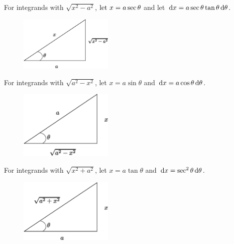 For integrands with $ \sqrt{x^{2}-a^{2}}$, $\text{let } x=a\sec \theta$ and let $\,\mathrm{d} x = a \sec \theta \tan \theta \,\mathrm{d} \theta $.
\begin{figure}[H]
  \begin{center}
    \includegraphics[width=0.4\textwidth]{continuous/integration/asectheta.eps}
  \end{center}
\end{figure}
For integrands with $\sqrt{a^2-x^2}$, let $x=a \sin \theta$ and $\,\mathrm{d} x = a \cos \theta \,\mathrm{d} \theta$.
\begin{figure}[H]
  \begin{center}
    \includegraphics[width=0.4\textwidth]{continuous/integration/asintheta.eps}
  \end{center}
\end{figure}
For integrands with $ \sqrt{x^2+a^2}$, let $x = a \tan \theta$ and $\,\mathrm{d} x = \sec^2 \theta \,\mathrm{d} \theta$.
\begin{figure}[H]
  \begin{center}
    \includegraphics[width=0.4\textwidth]{continuous/integration/atantheta.eps}
  \end{center}
\end{figure}

